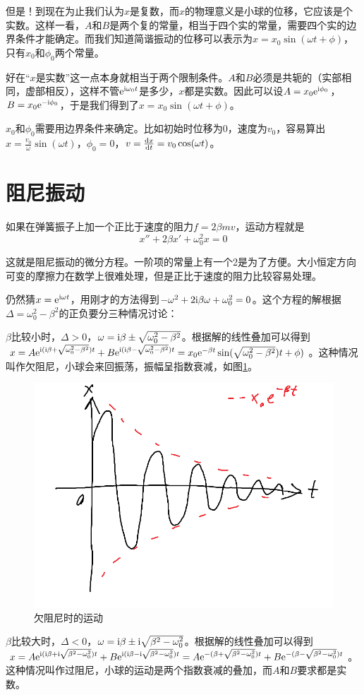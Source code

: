 但是！到现在为止我们认为$x$是复数，而$x$的物理意义是小球的位移，它应该是个实数。这样一看，$A$和$B$是两个复的常量，相当于四个实的常量，需要四个实的边界条件才能确定。而我们知道简谐振动的位移可以表示为$x=x_0 \sin(\omega t+\phi)$，只有$x_0$和$\phi_0$两个常量。

好在“$x$是实数”这一点本身就相当于两个限制条件。$A$和$B$必须是共轭的（实部相同，虚部相反），这样不管$\mathrm{e}^{\mathrm{i} \omega_0 t}$是多少，$x$都是实数。因此可以设$A=x_0 \mathrm{e}^{\mathrm{i} \phi_0}$，$B=x_0 \mathrm{e}^{-\mathrm{i} \phi_0}$，于是我们得到了$x=x_0 \sin(\omega t+\phi)$。

$x_0$和$\phi_0$需要用边界条件来确定。比如初始时位移为$0$，速度为$v_0$，容易算出$x=\frac{v_0}{\omega} \sin(\omega t)$，$\phi_0=0$，$v=\frac{\mathop{}\!\mathrm{d} x}{\mathop{}\!\mathrm{d} t}=v_0 \cos(\omega t)$。
\section{阻尼振动}
如果在弹簧振子上加一个正比于速度的阻力$f=2 \beta m v$，运动方程就是
\begin{equation*}
x''+2 \beta x'+\omega_0^2 x=0
\end{equation*}

这就是阻尼振动的微分方程。一阶项的常量上有一个2是为了方便。大小恒定方向可变的摩擦力在数学上很难处理，但是正比于速度的阻力比较容易处理。

仍然猜$x=\mathrm{e}^{\mathrm{i} \omega t}$，用刚才的方法得到$-\omega^2+2 \mathrm{i} \beta \omega+\omega_0^2=0$。这个方程的解根据$\Delta=\omega_0^2-\beta^2$的正负要分三种情况讨论：

$\beta$比较小时，$\Delta>0$，$\omega=\mathrm{i} \beta \pm \sqrt{\omega_0^2-\beta^2}$。根据解的线性叠加可以得到$x=A \mathrm{e}^{\mathrm{i} (\mathrm{i} \beta+\sqrt{\omega_0^2-\beta^2}) t}+B \mathrm{e}^{\mathrm{i} (\mathrm{i} \beta-\sqrt{\omega_0^2-\beta^2}) t}=x_0 \mathrm{e}^{-\beta t} \sin(\sqrt{\omega_0^2-\beta^2}) t+\phi)$。这种情况叫作欠阻尼，小球会来回振荡，振幅呈指数衰减，如图\ref{fig-under-dump}。
\begin{figure}[htb]
\centering
\includegraphics[width=0.33\linewidth]{fig/under-dump.png}
\caption{欠阻尼时的运动}
\label{fig-under-dump}
\end{figure}

$\beta$比较大时，$\Delta<0$，$\omega=\mathrm{i} \beta \pm \mathrm{i} \sqrt{\beta^2-\omega_0^2}$。根据解的线性叠加可以得到$x=A \mathrm{e}^{\mathrm{i} (\mathrm{i} \beta+\mathrm{i} \sqrt{\beta^2-\omega_0^2}) t}+B \mathrm{e}^{\mathrm{i} (\mathrm{i} \beta-\mathrm{i} \sqrt{\beta^2-\omega_0^2}) t}=A \mathrm{e}^{-(\beta+\sqrt{\beta^2-\omega_0^2})t}+B \mathrm{e}^{-(\beta-\sqrt{\beta^2-\omega_0^2})t}$。这种情况叫作过阻尼，小球的运动是两个指数衰减的叠加，而$A$和$B$要求都是实数。

